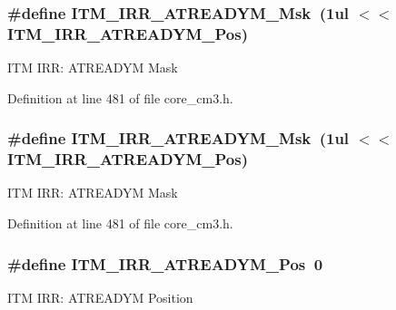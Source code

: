 \subsubsection[{\texorpdfstring{I\+T\+M\+\_\+\+I\+R\+R\+\_\+\+A\+T\+R\+E\+A\+D\+Y\+M\+\_\+\+Msk}{ITM_IRR_ATREADYM_Msk}}]{\setlength{\rightskip}{0pt plus 5cm}\#define I\+T\+M\+\_\+\+I\+R\+R\+\_\+\+A\+T\+R\+E\+A\+D\+Y\+M\+\_\+\+Msk~(1ul $<$$<$ I\+T\+M\+\_\+\+I\+R\+R\+\_\+\+A\+T\+R\+E\+A\+D\+Y\+M\+\_\+\+Pos)}\hypertarget{group___c_m_s_i_s___c_m3___i_t_m_ga3dbc3e15f5bde2669cd8121a1fe419b9}{}\label{group___c_m_s_i_s___c_m3___i_t_m_ga3dbc3e15f5bde2669cd8121a1fe419b9}
I\+TM I\+RR\+: A\+T\+R\+E\+A\+D\+YM Mask 

Definition at line 481 of file core\+\_\+cm3.\+h.

\subsubsection[{\texorpdfstring{I\+T\+M\+\_\+\+I\+R\+R\+\_\+\+A\+T\+R\+E\+A\+D\+Y\+M\+\_\+\+Msk}{ITM_IRR_ATREADYM_Msk}}]{\setlength{\rightskip}{0pt plus 5cm}\#define I\+T\+M\+\_\+\+I\+R\+R\+\_\+\+A\+T\+R\+E\+A\+D\+Y\+M\+\_\+\+Msk~(1ul $<$$<$ I\+T\+M\+\_\+\+I\+R\+R\+\_\+\+A\+T\+R\+E\+A\+D\+Y\+M\+\_\+\+Pos)}\hypertarget{group___c_m_s_i_s___c_m3___i_t_m_ga3dbc3e15f5bde2669cd8121a1fe419b9}{}\label{group___c_m_s_i_s___c_m3___i_t_m_ga3dbc3e15f5bde2669cd8121a1fe419b9}
I\+TM I\+RR\+: A\+T\+R\+E\+A\+D\+YM Mask 

Definition at line 481 of file core\+\_\+cm3.\+h.

\subsubsection[{\texorpdfstring{I\+T\+M\+\_\+\+I\+R\+R\+\_\+\+A\+T\+R\+E\+A\+D\+Y\+M\+\_\+\+Pos}{ITM_IRR_ATREADYM_Pos}}]{\setlength{\rightskip}{0pt plus 5cm}\#define I\+T\+M\+\_\+\+I\+R\+R\+\_\+\+A\+T\+R\+E\+A\+D\+Y\+M\+\_\+\+Pos~0}\hypertarget{group___c_m_s_i_s___c_m3___i_t_m_ga259edfd1d2e877a62e06d7a240df97f4}{}\label{group___c_m_s_i_s___c_m3___i_t_m_ga259edfd1d2e877a62e06d7a240df97f4}
I\+TM I\+RR\+: A\+T\+R\+E\+A\+D\+YM Position 

